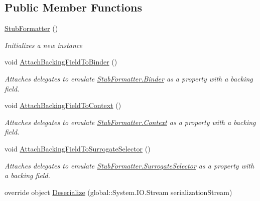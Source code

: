 \subsection*{Public Member Functions}
\begin{DoxyCompactItemize}
\item 
\hyperlink{class_system_1_1_runtime_1_1_serialization_1_1_fakes_1_1_stub_formatter_a906ac52585d88c6b5eb9a55332c79122}{Stub\-Formatter} ()
\begin{DoxyCompactList}\small\item\em Initializes a new instance\end{DoxyCompactList}\item 
void \hyperlink{class_system_1_1_runtime_1_1_serialization_1_1_fakes_1_1_stub_formatter_a45dc37f37407cc60591492b0fb182417}{Attach\-Backing\-Field\-To\-Binder} ()
\begin{DoxyCompactList}\small\item\em Attaches delegates to emulate \hyperlink{class_system_1_1_runtime_1_1_serialization_1_1_fakes_1_1_stub_formatter_a52b8994ef0819dd2e8b00780a33034ff}{Stub\-Formatter.\-Binder} as a property with a backing field.\end{DoxyCompactList}\item 
void \hyperlink{class_system_1_1_runtime_1_1_serialization_1_1_fakes_1_1_stub_formatter_a51b02e6610c4e9d2f21e72df865e98f3}{Attach\-Backing\-Field\-To\-Context} ()
\begin{DoxyCompactList}\small\item\em Attaches delegates to emulate \hyperlink{class_system_1_1_runtime_1_1_serialization_1_1_fakes_1_1_stub_formatter_a9f8367d6940c51e638362a16385e04fd}{Stub\-Formatter.\-Context} as a property with a backing field.\end{DoxyCompactList}\item 
void \hyperlink{class_system_1_1_runtime_1_1_serialization_1_1_fakes_1_1_stub_formatter_a24315854373dba3ade1d607bc57955d1}{Attach\-Backing\-Field\-To\-Surrogate\-Selector} ()
\begin{DoxyCompactList}\small\item\em Attaches delegates to emulate \hyperlink{class_system_1_1_runtime_1_1_serialization_1_1_fakes_1_1_stub_formatter_a978926d95f9d6b924264103603c07324}{Stub\-Formatter.\-Surrogate\-Selector} as a property with a backing field.\end{DoxyCompactList}\item 
override object \hyperlink{class_system_1_1_runtime_1_1_serialization_1_1_fakes_1_1_stub_formatter_a93d0d644fa07ef74a4ec7964478464ed}{Deserialize} (global\-::\-System.\-I\-O.\-Stream serialization\-Stream)

\end{DoxyCompactItemize}
